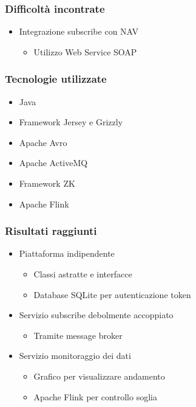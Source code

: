 \documentclass{beamer}
\begin{document}
\begin{frame}
\frametitle{Difficoltà incontrate}
\begin{itemize}
	\item Integrazione subscribe con NAV
	\begin{itemize}
		\item Utilizzo Web Service SOAP
	\end{itemize}
\end{itemize}
\end{frame}

\begin{frame}
\frametitle{Tecnologie utilizzate}
\begin{itemize}
	\item Java
	\item Framework Jersey e Grizzly
	\item Apache Avro
	\item Apache ActiveMQ
	\item Framework ZK
	\item Apache Flink
\end{itemize}
\end{frame}

\begin{frame}
\frametitle{Risultati raggiunti}
\begin{itemize}
	\item Piattaforma indipendente
	\begin{itemize}
		\item Classi astratte e interfacce
		\item Database SQLite per autenticazione token
	\end{itemize}
	\item Servizio subscribe debolmente accoppiato
	\begin{itemize}
		\item Tramite message broker
	\end{itemize}
	\item Servizio monitoraggio dei dati
	\begin{itemize}
		\item Grafico per visualizzare andamento
		\item Apache Flink per controllo soglia
	\end{itemize}
\end{itemize}
\end{frame}

\end{document}
